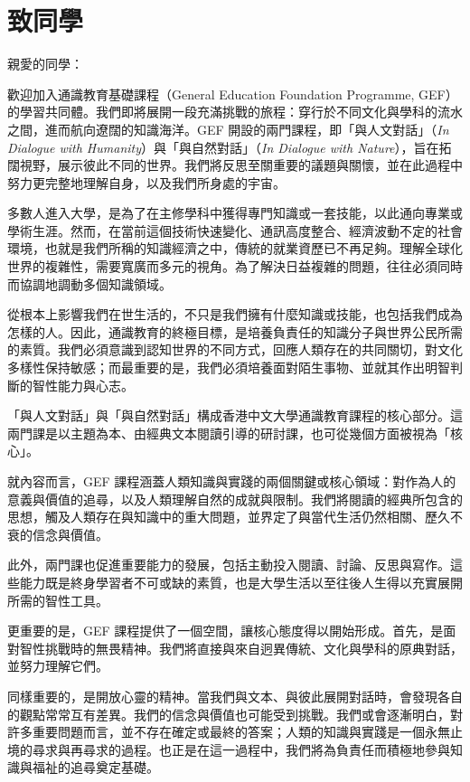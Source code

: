 \section*{致同學}
\noindent 親愛的同學：

\noindent 歡迎加入通識教育基礎課程（General Education Foundation Programme, GEF）的學習共同體。我們即將展開一段充滿挑戰的旅程：穿行於不同文化與學科的流水之間，進而航向遼闊的知識海洋。GEF 開設的兩門課程，即「與人文對話」（\textit{In Dialogue with Humanity}）與「與自然對話」（\textit{In Dialogue with Nature}），旨在拓闊視野，展示彼此不同的世界。我們將反思至關重要的議題與關懷，並在此過程中努力更完整地理解自身，以及我們所身處的宇宙。

\noindent 多數人進入大學，是為了在主修學科中獲得專門知識或一套技能，以此通向專業或學術生涯。然而，在當前這個技術快速變化、通訊高度整合、經濟波動不定的社會環境，也就是我們所稱的知識經濟之中，傳統的就業資歷已不再足夠。理解全球化世界的複雜性，需要寬廣而多元的視角。為了解決日益複雜的問題，往往必須同時而協調地調動多個知識領域。

\noindent 從根本上影響我們在世生活的，不只是我們擁有什麼知識或技能，也包括我們成為怎樣的人。因此，通識教育的終極目標，是培養負責任的知識分子與世界公民所需的素質。我們必須意識到認知世界的不同方式，回應人類存在的共同關切，對文化多樣性保持敏感；而最重要的是，我們必須培養面對陌生事物、並就其作出明智判斷的智性能力與心志。

\noindent 「與人文對話」與「與自然對話」構成香港中文大學通識教育課程的核心部分。這兩門課是以主題為本、由經典文本閱讀引導的研討課，也可從幾個方面被視為「核心」。

\noindent 就內容而言，GEF 課程涵蓋人類知識與實踐的兩個關鍵或核心領域：對作為人的意義與價值的追尋，以及人類理解自然的成就與限制。我們將閱讀的經典所包含的思想，觸及人類存在與知識中的重大問題，並界定了與當代生活仍然相關、歷久不衰的信念與價值。

\noindent 此外，兩門課也促進重要能力的發展，包括主動投入閱讀、討論、反思與寫作。這些能力既是終身學習者不可或缺的素質，也是大學生活以至往後人生得以充實展開所需的智性工具。

\noindent 更重要的是，GEF 課程提供了一個空間，讓核心態度得以開始形成。首先，是面對智性挑戰時的無畏精神。我們將直接與來自迥異傳統、文化與學科的原典對話，並努力理解它們。

\noindent 同樣重要的，是開放心靈的精神。當我們與文本、與彼此展開對話時，會發現各自的觀點常常互有差異。我們的信念與價值也可能受到挑戰。我們或會逐漸明白，對許多重要問題而言，並不存在確定或最終的答案；人類的知識與實踐是一個永無止境的尋求與再尋求的過程。也正是在這一過程中，我們將為負責任而積極地參與知識與福祉的追尋奠定基礎。

